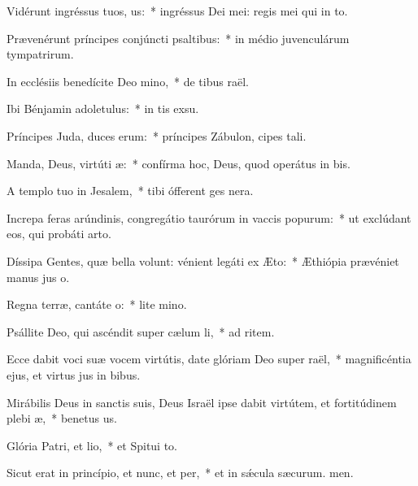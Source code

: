 \item Vidérunt ingréssus tuos, us:~* ingréssus Dei mei: regis mei qui  in to.
\item Prævenérunt príncipes conjúncti psaltibus:~* in médio juvenculárum tympatrirum.
\item In ecclésiis benedícite Deo mino,~* de tibus raël.
\item Ibi Bénjamin adoletulus:~* in tis exsu.
\item Príncipes Juda, duces erum:~* príncipes Zábulon, cipes tali.
\item Manda, Deus, virtúti æ:~* confírma hoc, Deus, quod operátus  in bis.
\item A templo tuo in Jesalem,~* tibi ófferent ges nera.
\item Increpa feras arúndinis, congregátio taurórum in vaccis popurum:~* ut exclúdant eos, qui probáti  arto.
\item Díssipa Gentes, quæ bella volunt: vénient legáti ex Æto:~* Æthiópia prævéniet manus jus o.
\item Regna terræ, cantáte o:~* lite mino.
\item Psállite Deo, qui ascéndit super cælum li,~* ad ritem.
\item Ecce dabit voci suæ vocem virtútis, date glóriam Deo super raël,~* magnificéntia ejus, et virtus jus in bibus.
\item Mirábilis Deus in sanctis suis, Deus Israël ipse dabit virtútem, et fortitúdinem plebi æ,~* benetus us.
\item Glória Patri, et lio,~* et Spitui to.
\item Sicut erat in princípio, et nunc, et per,~* et in sǽcula sæcurum. men.
